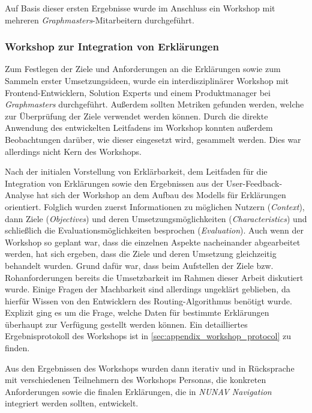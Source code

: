\bigskip

Auf Basis dieser ersten Ergebnisse wurde im Anschluss ein Workshop mit mehreren \textit{Graphmasters}-Mitarbeitern durchgeführt.

\subsubsection{Workshop zur Integration von Erklärungen}

Zum Festlegen der Ziele und Anforderungen an die Erklärungen sowie zum Sammeln erster Umsetzungsideen, wurde ein interdisziplinärer Workshop mit Frontend-Entwicklern, \glqq Solution Experts\grqq{} und einem Produktmanager bei \textit{Graphmasters} durchgeführt. Außerdem sollten Metriken gefunden werden, welche zur Überprüfung der Ziele verwendet werden können. Durch die direkte Anwendung des entwickelten Leitfadens im Workshop konnten außerdem Beobachtungen darüber, wie dieser eingesetzt wird, gesammelt werden. Dies war allerdings nicht Kern des Workshops. 

Nach der initialen Vorstellung von Erklärbarkeit, dem Leitfaden für die Integration von Erklärungen sowie den Ergebnissen aus der User-Feedback-Analyse hat sich der Workshop an dem Aufbau des Modells für Erklärungen orientiert. Folglich wurden zuerst Informationen zu möglichen Nutzern (\textit{Context}), dann Ziele (\textit{Objectives}) und deren Umsetzungsmöglichkeiten (\textit{Characteristics}) und schließlich die Evaluationsmöglichkeiten besprochen (\textit{Evaluation}). Auch wenn der Workshop so geplant war, dass die einzelnen Aspekte nacheinander abgearbeitet werden, hat sich ergeben, dass die Ziele und deren Umsetzung gleichzeitig behandelt wurden. Grund dafür war, dass beim Aufstellen der Ziele bzw. Rohanforderungen bereits die Umsetzbarkeit im Rahmen dieser Arbeit diskutiert wurde. Einige Fragen der Machbarkeit sind allerdings ungeklärt geblieben, da hierfür Wissen von den Entwicklern des Routing-Algorithmus benötigt wurde. Explizit ging es um die Frage, welche Daten für bestimmte Erklärungen überhaupt zur Verfügung gestellt werden können. Ein detailliertes Ergebnisprotokoll des Workshops ist in \autoref{sec:appendix_workshop_protocol} zu finden.

Aus den Ergebnissen des Workshops wurden dann iterativ und in Rücksprache mit verschiedenen Teilnehmern des Workshops Personas, die konkreten Anforderungen sowie die finalen Erklärungen, die in \textit{NUNAV Navigation} integriert werden sollten, entwickelt.